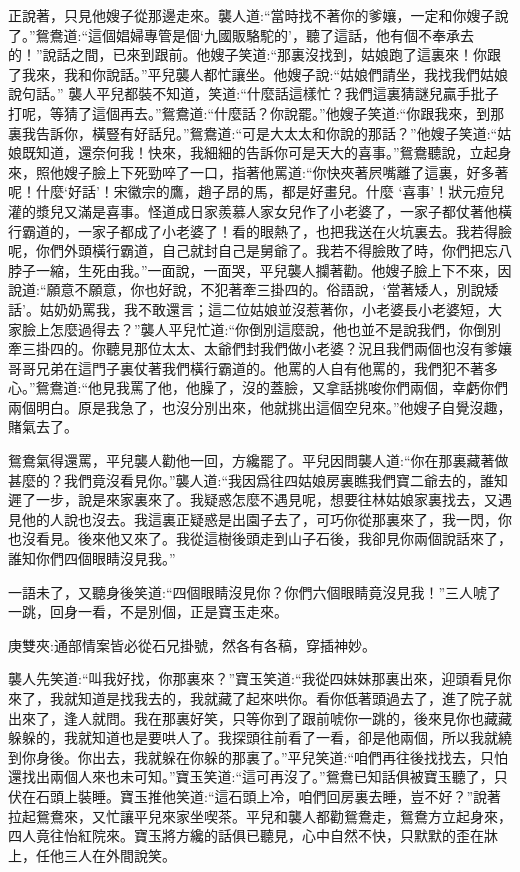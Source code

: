 \begin{parag}
    正說著，只見他嫂子從那邊走來。襲人道:“當時找不著你的爹孃，一定和你嫂子說了。”鴛鴦道:“這個娼婦專管是個‘九國販駱駝的’，聽了這話，他有個不奉承去的！”說話之間，已來到跟前。他嫂子笑道:“那裏沒找到，姑娘跑了這裏來！你跟了我來，我和你說話。”平兒襲人都忙讓坐。他嫂子說:“姑娘們請坐，我找我們姑娘說句話。” 襲人平兒都裝不知道，笑道:“什麼話這樣忙？我們這裏猜謎兒贏手批子打呢，等猜了這個再去。”鴛鴦道:“什麼話？你說罷。”他嫂子笑道:“你跟我來，到那裏我告訴你，橫豎有好話兒。”鴛鴦道:“可是大太太和你說的那話？”他嫂子笑道:“姑娘既知道，還奈何我！快來，我細細的告訴你可是天大的喜事。”鴛鴦聽說，立起身來，照他嫂子臉上下死勁啐了一口，指著他罵道:“你快夾著屄嘴離了這裏，好多著呢！什麼‘好話’！宋徽宗的鷹，趙子昂的馬，都是好畫兒。什麼 ‘喜事’！狀元痘兒灌的漿兒又滿是喜事。怪道成日家羨慕人家女兒作了小老婆了，一家子都仗著他橫行霸道的，一家子都成了小老婆了！看的眼熱了，也把我送在火坑裏去。我若得臉呢，你們外頭橫行霸道，自己就封自己是舅爺了。我若不得臉敗了時，你們把忘八脖子一縮，生死由我。”一面說，一面哭，平兒襲人攔著勸。他嫂子臉上下不來，因說道:“願意不願意，你也好說，不犯著牽三掛四的。俗語說，‘當著矮人，別說矮話’。姑奶奶罵我，我不敢還言；這二位姑娘並沒惹著你，小老婆長小老婆短，大家臉上怎麼過得去？”襲人平兒忙道:“你倒別這麼說，他也並不是說我們，你倒別牽三掛四的。你聽見那位太太、太爺們封我們做小老婆？況且我們兩個也沒有爹孃哥哥兄弟在這門子裏仗著我們橫行霸道的。他罵的人自有他罵的，我們犯不著多心。”鴛鴦道:“他見我罵了他，他臊了，沒的蓋臉，又拿話挑唆你們兩個，幸虧你們兩個明白。原是我急了，也沒分別出來，他就挑出這個空兒來。”他嫂子自覺沒趣，賭氣去了。
\end{parag}


\begin{parag}
    鴛鴦氣得還罵，平兒襲人勸他一回，方纔罷了。平兒因問襲人道:“你在那裏藏著做甚麼的？我們竟沒看見你。”襲人道:“我因爲往四姑娘房裏瞧我們寶二爺去的，誰知遲了一步，說是來家裏來了。我疑惑怎麼不遇見呢，想要往林姑娘家裏找去，又遇見他的人說也沒去。我這裏正疑惑是出園子去了，可巧你從那裏來了，我一閃，你也沒看見。後來他又來了。我從這樹後頭走到山子石後，我卻見你兩個說話來了，誰知你們四個眼睛沒見我。”
\end{parag}


\begin{parag}
    一語未了，又聽身後笑道:“四個眼睛沒見你？你們六個眼睛竟沒見我！”三人唬了一跳，回身一看，不是別個，正是寶玉走來。\begin{note}庚雙夾:通部情案皆必從石兄掛號，然各有各稿，穿插神妙。\end{note}襲人先笑道:“叫我好找，你那裏來？”寶玉笑道:“我從四妹妹那裏出來，迎頭看見你來了，我就知道是找我去的，我就藏了起來哄你。看你低著頭過去了，進了院子就出來了，逢人就問。我在那裏好笑，只等你到了跟前唬你一跳的，後來見你也藏藏躲躲的，我就知道也是要哄人了。我探頭往前看了一看，卻是他兩個，所以我就繞到你身後。你出去，我就躲在你躲的那裏了。”平兒笑道:“咱們再往後找找去，只怕還找出兩個人來也未可知。”寶玉笑道:“這可再沒了。”鴛鴦已知話俱被寶玉聽了，只伏在石頭上裝睡。寶玉推他笑道:“這石頭上冷，咱們回房裏去睡，豈不好？”說著拉起鴛鴦來，又忙讓平兒來家坐喫茶。平兒和襲人都勸鴛鴦走，鴛鴦方立起身來，四人竟往怡紅院來。寶玉將方纔的話俱已聽見，心中自然不快，只默默的歪在牀上，任他三人在外間說笑。
\end{parag}


